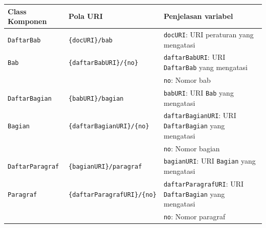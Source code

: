\begin{longtable}{|p{}|p{}|p{}|}
  \hline
  Class Komponen          & Pola URI                              & Penjelasan variabel                                                                                                                                      \\ \hline \endhead
  \texttt{DaftarBab}      & \texttt{\{docURI\}/bab}               & \texttt{docURI}: URI peraturan yang mengatasi                                                                                                            \\ \hline
  \texttt{Bab}            & \texttt{\{daftarBabURI\}/\{no\}}      & \texttt{daftarBabURI}: URI \texttt{DaftarBab} yang mengatasi                                                                                             \\
                          &                                       & \texttt{no}: Nomor bab                                                                                                                                   \\ \hline
  \texttt{DaftarBagian}   & \texttt{\{babURI\}/bagian}            & \texttt{babURI}: URI \texttt{Bab} yang mengatasi                                                                                                         \\ \hline
  \texttt{Bagian}         & \texttt{\{daftarBagianURI\}/\{no\}}   & \texttt{daftarBagianURI}: URI \texttt{DaftarBagian} yang mengatasi                                                                                       \\
                          &                                       & \texttt{no}: Nomor bagian                                                                                                                                \\ \hline
  \texttt{DaftarParagraf} & \texttt{\{bagianURI\}/paragraf}       & \texttt{bagianURI}: URI \texttt{Bagian} yang mengatasi                                                                                                   \\ \hline
  \texttt{Paragraf}       & \texttt{\{daftarParagrafURI\}/\{no\}} & \texttt{daftarParagrafURI}: URI \texttt{DaftarBagian} yang mengatasi                                                                                     \\
                          &                                       & \texttt{no}: Nomor paragraf                                                                                                                              \\ \hline

\end{longtable}
